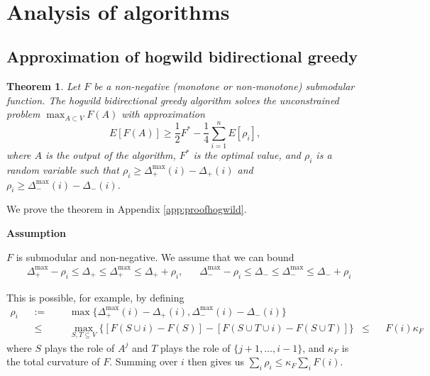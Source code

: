 \documentclass{article} %
\newtheorem{thm}{Theorem}[section]
\begin{document}
~











\section{Analysis of algorithms}

\subsection{Approximation of hogwild bidirectional greedy}
\begin{thm}\label{thm:randomapprox} Let $F$ be a non-negative (monotone or non-monotone) submodular function.
The hogwild bidirectional greedy algorithm solves the unconstrained problem $\max_{A\subset V} F(A)$ with approximation
\[
E[F(A)] \geq \frac{1}{2}F^* - \frac{1}{4}\sum_{i=1}^n E[\rho_i],
\]
where $A$ is the output of the algorithm, $F^*$ is the optimal value, and $\rho_i$ is a random variable such that $\rho_i \geq \Delta_+^{\max}(i) - \Delta_+(i)$ and $\rho_i \geq \Delta_-^{\max}(i) - \Delta_-(i)$.
\end{thm}

We prove the theorem in Appendix \ref{app:proofhogwild}.

\textbf{Assumption}

$F$ is submodular and non-negative.
We assume that we can bound
\begin{align*}
&\Delta_+^{\max} - \rho_i \leq \Delta_+ \leq \Delta_+^{\max} \leq \Delta_+ + \rho_i,&
&\Delta_-^{\max} - \rho_i \leq \Delta_- \leq \Delta_-^{\max} \leq \Delta_- + \rho_i
\end{align*}

This is possible, for example, by defining
\begin{align*}
\rho_i
&&:=&&&   \max\{\Delta_+^{\max}(i) - \Delta_+(i), \Delta_-^{\max}(i) - \Delta_-(i)\}\\
&&\leq&&& \max_{S,T\subseteq V} \{[F(S\cup i) - F(S)] - [F(S \cup T \cup i) - F(S \cup T)]\}
&\leq&& F(i)\kappa_F
\end{align*}
where $S$ plays the role of $A^j$ and $T$ plays the role of $\{j+1,\dots, i-1\}$, and $\kappa_F$ is the total curvature of $F$.
Summing over $i$ then gives us $\sum_i \rho_i \leq \kappa_F\sum_i F(i)$.
\end{document}
